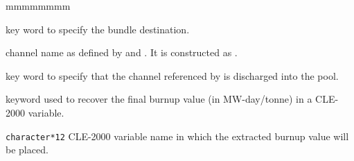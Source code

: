 \begin{ListeDeDescription}{mmmmmmmm}
\item[\moc{TO}] key word to specify the bundle destination.

\item[\dusa{NMCHA2}] channel name as defined by  and
. It is constructed as . 

\item[\moc{POOL}] key word to specify that the channel referenced by
 is discharged into the pool.

\item[\moc{PICK}]  keyword used to recover the final burnup value (in MW-day/tonne) in a CLE-2000 variable.

\item[\dusa{burnup}] \texttt{character*12} CLE-2000 variable name in which the extracted burnup value will be placed.

\end{ListeDeDescription}
\clearpage
